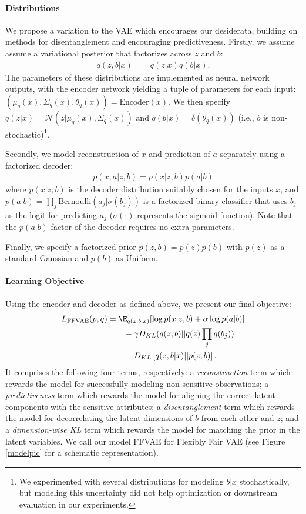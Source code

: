 \paragraph{Distributions}
We propose a variation to the VAE which encourages our desiderata, building on methods for disentanglement and encouraging predictiveness. 
Firstly, we assume assume a variational posterior that factorizes across $z$ and $b$:
\begin{align}
    q(z,b|x) &= q(z|x)q(b|x).
\end{align}
The parameters of these distributions are implemented as neural network outputs, with the encoder network yielding a tuple of parameters for each input: $(\mu_q(x), \Sigma_q(x), \theta_q(x))=\text{Encoder}(x)$.
We then specify $q(z|x)=\mathcal{N}(z|\mu_q(x), \Sigma_q(x))$ and $q(b|x)=\delta(\theta_q(x))$ (i.e., $b$ is non-stochastic)\footnote{
We experimented with several distributions for modeling $b|x$ stochastically, but modeling this uncertainty did not help optimization or downstream evaluation in our experiments.
}.

Secondly, we model reconstruction of $x$ and prediction of $a$ separately using a factorized decoder:
\begin{align}
    p(x,a|z,b)=p(x|z,b)p(a|b)
\end{align}
where $p(x|z,b)$ is the decoder distribution suitably chosen for the inputs $x$, and $p(a|b)=\prod_j\text{Bernoulli}(a_j|\sigma(b_j))$ is a factorized binary classifier that uses $b_j$ as the logit for predicting $a_j$ ($\sigma(\cdot)$ represents the sigmoid function).
Note that the $p(a|b)$ factor of the decoder requires no extra parameters.

Finally, we specify a factorized prior $p(z,b)=p(z)p(b)$ with $p(z)$ as a standard Gaussian and $p(b)$ as Uniform.

\paragraph{Learning Objective}
Using the encoder and decoder as defined above, we present our final objective:
\begin{align} \label{eq:ffvae}
    \nonumber L_{\text{FFVAE}}(p,q) &= \E_{q(z,b|x)} [ \log p(x|z,b) + \alpha \log p(a|b)] \nonumber \\
    &\quad\quad - \gamma D_{KL}(q(z,b)||q(z)\prod_j q(b_j))
     \nonumber\\
    &\quad\quad - D_{KL} \left[ q(z,b|x) || p(z,b) \right].
\end{align}
It comprises the following four terms, respectively:
a \textit{reconstruction} term which rewards the model for successfully modeling non-sensitive observations;
a \textit{predictiveness} term which rewards the model for aligning the correct latent components with the sensitive attributes; 
a \textit{disentanglement} term which rewards the model for decorrelating the latent dimensions of $b$ from each other and $z$;
and a \textit{dimension-wise KL} term which rewards the model for matching the prior in the latent variables.
We call our model \mbox{FFVAE} for Flexibly Fair VAE (see Figure \ref{modelpic} for a schematic representation).


